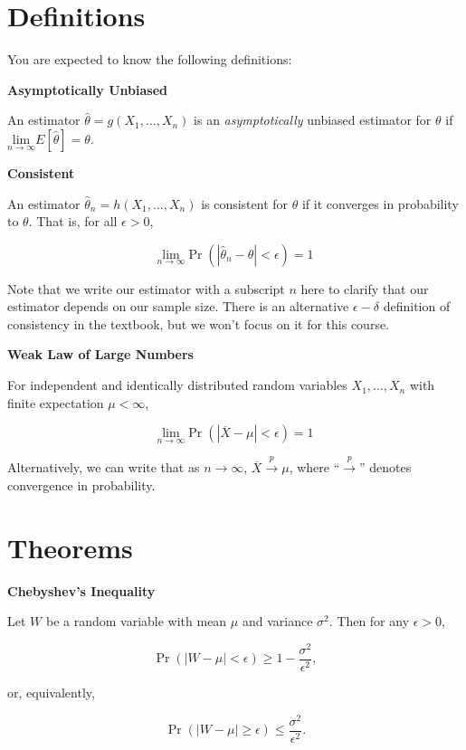 \documentclass[
  letterpaper,
  DIV=11,
  numbers=noendperiod]{scrreprt}
\begin{document}
\hypertarget{definitions-4}{%
\section{Definitions}\label{definitions-4}}

You are expected to know the following definitions:

\textbf{Asymptotically Unbiased}

An estimator \(\hat{\theta} = g(X_1, \dots, X_n)\) is an
\emph{asymptotically} unbiased estimator for \(\theta\) if
\(\underset{n \to \infty}{\text{lim}} E[\hat{\theta}] = \theta\).

\textbf{Consistent}

An estimator \(\hat{\theta}_n = h(X_1, \dots, X_n)\) is consistent for
\(\theta\) if it converges in probability to \(\theta\). That is, for
all \(\epsilon > 0\),

\[
\underset{n \to \infty}{\text{lim}} \Pr(| \hat{\theta}_n - \theta | < \epsilon) = 1
\]

Note that we write our estimator with a subscript \(n\) here to clarify
that our estimator depends on our sample size. There is an alternative
\(\epsilon-\delta\) definition of consistency in the textbook, but we
won't focus on it for this course.

\textbf{Weak Law of Large Numbers}

For independent and identically distributed random variables
\(X_1, \dots, X_n\) with finite expectation \(\mu < \infty\),

\[
\underset{n \to \infty}{\text{lim}} \Pr(| \overline{X} - \mu | < \epsilon) = 1
\]

Alternatively, we can write that as \(n \to \infty\),
\(\overline{X} \overset{p}{\to} \mu\), where ``\(\overset{p}{\to}\)''
denotes convergence in probability.

\hypertarget{theorems-4}{%
\section{Theorems}\label{theorems-4}}

\textbf{Chebyshev's Inequality}

Let \(W\) be a random variable with mean \(\mu\) and variance
\(\sigma^2\). Then for any \(\epsilon > 0\),

\[
\Pr(|W - \mu| < \epsilon) \geq 1 - \frac{\sigma^2}{\epsilon^2},
\]

or, equivalently,

\[
\Pr(|W - \mu| \geq \epsilon) \leq \frac{\sigma^2}{\epsilon^2}.
\]
\end{document}

